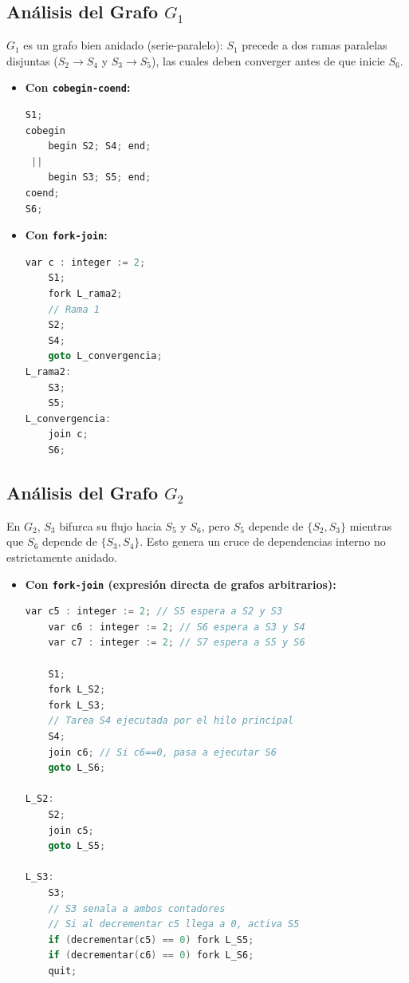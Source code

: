 \begin{solucion}
\subsection*{Análisis del Grafo $G_1$}
$G_1$ es un grafo bien anidado (serie-paralelo): $S_1$ precede a dos ramas paralelas disjuntas ($S_2 \to S_4$ y $S_3 \to S_5$), las cuales deben converger antes de que inicie $S_6$.
\begin{itemize}[leftmargin=*]
    \item \textbf{Con \texttt{cobegin-coend}:}
\begin{lstlisting}[language=C++]
S1;
cobegin
    begin S2; S4; end;
 ||
    begin S3; S5; end;
coend;
S6;
\end{lstlisting}

    \item \textbf{Con \texttt{fork-join}:}
\begin{lstlisting}[language=C++]
    var c : integer := 2;
    S1;
    fork L_rama2;
    // Rama 1
    S2;
    S4;
    goto L_convergencia;
L_rama2:
    S3;
    S5;
L_convergencia:
    join c;
    S6;
\end{lstlisting}
\end{itemize}

\subsection*{Análisis del Grafo $G_2$}
En $G_2$, $S_3$ bifurca su flujo hacia $S_5$ y $S_6$, pero $S_5$ depende de $\{S_2, S_3\}$ mientras que $S_6$ depende de $\{S_3, S_4\}$. Esto genera un cruce de dependencias interno no estrictamente anidado.
\begin{itemize}[leftmargin=*]
    \item \textbf{Con \texttt{fork-join} (expresión directa de grafos arbitrarios):}
\begin{lstlisting}[language=C++]
    var c5 : integer := 2; // S5 espera a S2 y S3
    var c6 : integer := 2; // S6 espera a S3 y S4
    var c7 : integer := 2; // S7 espera a S5 y S6

    S1;
    fork L_S2;
    fork L_S3;
    // Tarea S4 ejecutada por el hilo principal
    S4;
    join c6; // Si c6==0, pasa a ejecutar S6
    goto L_S6;

L_S2:
    S2;
    join c5;
    goto L_S5;

L_S3:
    S3;
    // S3 senala a ambos contadores
    // Si al decrementar c5 llega a 0, activa S5
    if (decrementar(c5) == 0) fork L_S5;
    if (decrementar(c6) == 0) fork L_S6;
    quit;


\end{lstlisting}
\end{itemize}
\end{solucion}
